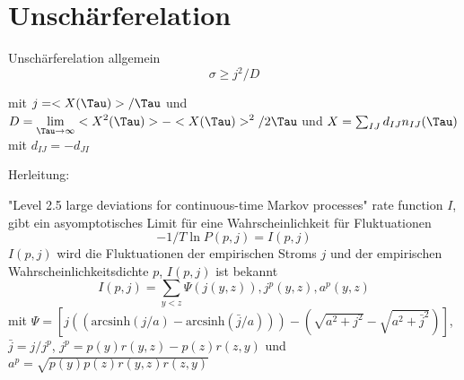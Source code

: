 \documentclass[aspectratio=1610, 9pt]{beamer}
\begin{document}
\section{Unschärferelation}
\begin{frame}
  \begin{block}{Unschärferelation allgemein}
    \begin{equation*}
      \sigma \geq j^2 / D 
      \end{equation*}

      \begin{center}
        mit $j= <X(\Tau)>/\Tau$ und $D= \displaystyle{\lim_{\Tau \to \infty}} <X^2(\Tau)> - <X(\Tau)>^2 / 2 \Tau$ und $X = \sum_{IJ} d_{IJ} n_{IJ}(\Tau)$ 
        mit $d_{IJ} = - d_{JI}$
      \end{center}

  \end{block}
  Herleitung:

  "Level 2.5 large deviations for continuous-time Markov processes" rate function $I$, gibt ein asyomptotisches Limit für eine Wahrscheinlichkeit für Fluktuationen
  \begin{equation*}
    -1 / T \ln P(p, j) = I(p,j)
  \end{equation*}
  $I(p,j)$ wird die Fluktuationen der empirischen Stroms $j$ und der empirischen Wahrscheinlichkeitsdichte $p$, $I(p,j)$ ist bekannt
  \begin{equation*}
     I(p,j) = \sum_{y<z} \Psi(j(y,z)), j^p(y,z), a^p(y,z)
  \end{equation*}
  mit $\Psi = \left[ j \left( (\text{arcsinh}(j/a)- \text{arcsinh}(\bar{j}/a) )\right) - \left( \sqrt{ a^2 + j^2}- \sqrt{ a^2 + \bar{j}^2}\right) \right]$, 
  $\bar{j}= j / j^p$,
  $j^p = p(y)r(y,z)- p(z)r(z,y)$ und 
  $a^p = \sqrt{p(y)p(z)r(y,z)r(z,y)}$
\end{frame}
\end{document}
